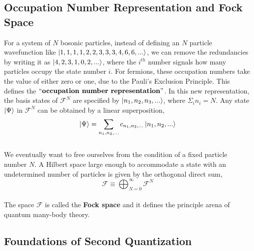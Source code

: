 \documentclass{article}
\begin{document}
\subsection{Occupation Number Representation and Fock Space}
For a system of $N$ bosonic particles, instead of defining an $N$ particle wavefunction like $\ket{1, 1, 1, 1, 2, 2, 3, 3, 3, 4, 6, 6, ...}$, we can remove the redundancies by writing it as $\ket{4, 2, 3, 1, 0, 2, ...}$, where the $i^{th}$ number signals how many particles occupy the state number $i$. For fermions, these occupation numbers take the value of either zero or one, due to the Pauli's Exclusion Principle. This defines the $``\textbf{occupation number representation}"$. In this new representation, the basis states of $\mathcal{F}^N$  are specified by $\ket{n_1, n_2, n_3, ...}$, where $\Sigma_i n_i = N$. Any state $\ket{\Psi}$ in $\mathcal{F}^N$ can be obtained by a linear superposition, 
\\
\begin{equation}
\ket{\Psi} = \sum_{n_1, n_2, ...} c_{n_1,n_2,...}\ket{n_1, n_2,...}
\end{equation}
\\
We eventually want to free ourselves from the condition of a fixed particle number $N$. A Hilbert space large enough to accommodate a state with an undetermined number of particles is given by the orthogonal direct sum,
\\
\begin{equation}
\mathcal{F} \equiv \bigoplus_{N=0}^{\infty} \mathcal{F}^N
\end{equation}
\\
The space $\mathcal{F}$ is called the \textbf{Fock space} and it defines the principle arena of quantum many-body theory.
\subsection{Foundations of Second Quantization}
\end{document}
